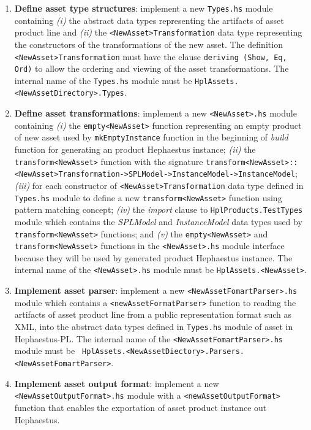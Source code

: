 \begin{enumerate}
  \item \textbf{Define asset type structures}:  implement a new \texttt{Types.hs} module containing \textit{(i)} the abstract data types representing the artifacts of asset product line and \textit{(ii)} the \texttt{<NewAsset>Transformation} data type representing the constructors of the transformations of the new asset. The definition \texttt{<NewAsset>Transformation} must have the clause \texttt{deriving (Show, Eq, Ord)} to allow the ordering and viewing of the asset transformations. The internal name of the \texttt{Types.hs} module must be \texttt{HplAssets.<NewAssetDirectory>.Types}.

  \item \textbf{Define asset transformations}: implement a new \texttt{<NewAsset>.hs} module containing \textit{(i)} the \texttt{empty<NewAsset>} function representing an empty product of new asset used by \texttt{mkEmptyInstance} function in the beginning of \emph{build} function for generating an product Hephaestus instance; \textit{(ii)} the \texttt{transform<NewAsset>} function with the signature \texttt{transform<NewAsset>::<NewAsset>Transformation->SPLModel->InstanceModel->InstanceModel}; \textit{(iii)} for each constructor of \texttt{<NewAsset>Transformation} data type defined in \texttt{Types.hs} module to define a new \texttt{transform<NewAsset>} function using pattern matching concept; \textit{(iv)} the \textit{import} clause to \texttt{HplProducts.TestTypes} module which contains the \emph{SPLModel} and \emph{InstanceModel} data types used by \texttt{transform<NewAsset>} functions; and \textit{(v)} the \texttt{empty<NewAsset>} and \texttt{transform<NewAsset>} functions in the \texttt{<NewAsset>.hs} module interface because they will be used by generated product Hephaestus instance.
The internal name of the \texttt{<NewAsset>.hs} module must be \texttt{HplAssets.<NewAsset>}.

  \item \textbf{Implement asset parser}: implement a new \texttt{<NewAssetFomartParser>.hs} module which contains a \texttt{<newAssetFormatParser>} function to reading the artifacts of asset product line from a public representation format such as XML, into the abstract data types defined in \texttt{Types.hs} module of asset in Hephaestus-PL.
  The internal name of the \texttt{<NewAssetFomartParser>.hs} module must be \texttt{ HplAssets.<NewAssetDiectory>.Parsers.<NewAssetFomartParser>}.

  \item \textbf{Implement asset output format}: implement a new \texttt{<NewAssetOutputFormat>.hs} module with a \texttt{<newAssetOutputFormat>} function that enables the exportation of asset product instance out Hephaestus.


\end{enumerate}
